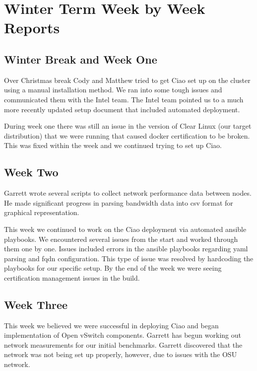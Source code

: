 \documentclass[10pt,onecolumn,journal,draftclsnofoot]{IEEEtran}
\begin{document}
\section{Winter Term Week by Week Reports}

\subsection{Winter Break and Week One}

Over Christmas break Cody and Matthew tried to get Ciao set up on the cluster
using a manual installation method. We ran into some tough issues and
communicated them with the Intel team. The Intel team pointed us to
a much more recently updated setup document that included automated deployment.

During week one there was still an issue in the version of Clear Linux (our
target distribution) that we were running that caused docker certification to be
broken. This was fixed within the week and we continued trying to set up Ciao.

\subsection{Week Two}

Garrett wrote several scripts to collect network performance data between nodes.
He made significant progress in parsing bandwidth data into csv format for
graphical representation.

This week we continued to work on the Ciao deployment via automated ansible
playbooks. We encountered several issues from the start and worked through
them one by one. Issues included errors in the ansible playbooks regarding yaml
parsing and fqdn configuration. This type of issue was resolved by hardcoding
the playbooks for our specific setup. By the end of the week we were seeing
certification management issues in the build.

\subsection{Week Three}

This week we believed we were successful in deploying Ciao and began implementation of
Open vSwitch components. Garrett has begun working out network measurements for
our initial benchmarks. Garrett discovered that the network was not being set up
properly, however, due to issues with the OSU network.
\end{document}
